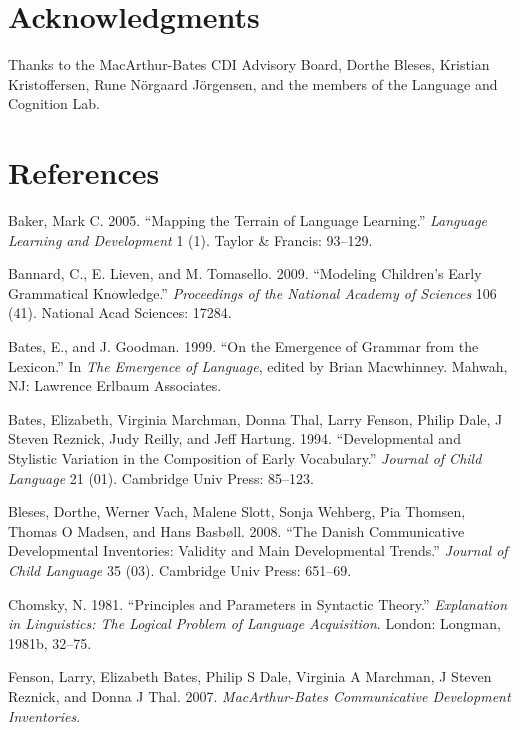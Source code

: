 \documentclass[authoryear, review]{elsarticle}
\begin{document}
\section{Acknowledgments}\label{acknowledgments}

Thanks to the MacArthur-Bates CDI Advisory Board, Dorthe Bleses,
Kristian Kristoffersen, Rune Nörgaard Jörgensen, and the members of the
Language and Cognition Lab.

\section*{References}\label{references}

Baker, Mark C. 2005. ``Mapping the Terrain of Language Learning.''
\emph{Language Learning and Development} 1 (1). Taylor \& Francis:
93--129.

Bannard, C., E. Lieven, and M. Tomasello. 2009. ``Modeling Children's
Early Grammatical Knowledge.'' \emph{Proceedings of the National Academy
of Sciences} 106 (41). National Acad Sciences: 17284.

Bates, E., and J. Goodman. 1999. ``On the Emergence of Grammar from the
Lexicon.'' In \emph{The Emergence of Language}, edited by Brian
Macwhinney. Mahwah, NJ: Lawrence Erlbaum Associates.

Bates, Elizabeth, Virginia Marchman, Donna Thal, Larry Fenson, Philip
Dale, J Steven Reznick, Judy Reilly, and Jeff Hartung. 1994.
``Developmental and Stylistic Variation in the Composition of Early
Vocabulary.'' \emph{Journal of Child Language} 21 (01). Cambridge Univ
Press: 85--123.

Bleses, Dorthe, Werner Vach, Malene Slott, Sonja Wehberg, Pia Thomsen,
Thomas O Madsen, and Hans Basbøll. 2008. ``The Danish Communicative
Developmental Inventories: Validity and Main Developmental Trends.''
\emph{Journal of Child Language} 35 (03). Cambridge Univ Press: 651--69.

Chomsky, N. 1981. ``Principles and Parameters in Syntactic Theory.''
\emph{Explanation in Linguistics: The Logical Problem of Language
Acquisition}. London: Longman, 1981b, 32--75.

Fenson, Larry, Elizabeth Bates, Philip S Dale, Virginia A Marchman, J
Steven Reznick, and Donna J Thal. 2007. \emph{MacArthur-Bates
Communicative Development Inventories}.
\end{document}
